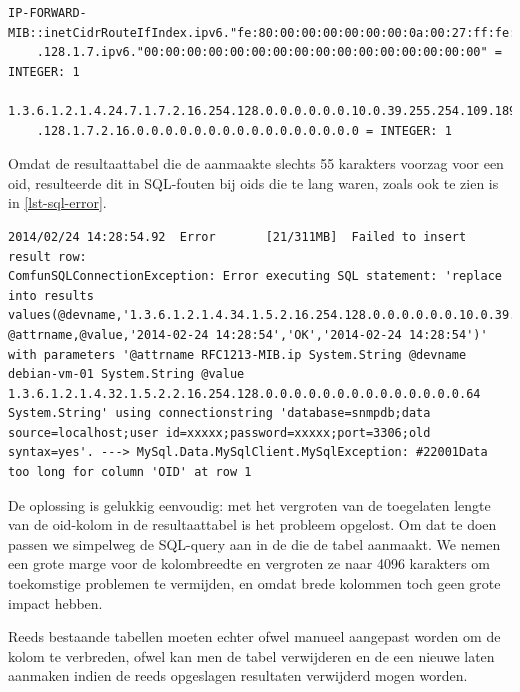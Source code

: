\begin{lstlisting}[float=h, caption={[Tekstuele en numerieke notatie van een OID uit inetCidrRouteTable]Tekstuele en numerieke notatie van een \gls{oid} uit inetCidrRouteTable}, label=lst-lange-oids]
IP-FORWARD-MIB::inetCidrRouteIfIndex.ipv6."fe:80:00:00:00:00:00:00:0a:00:27:ff:fe:6d:bd:c5"
	.128.1.7.ipv6."00:00:00:00:00:00:00:00:00:00:00:00:00:00:00:00" = INTEGER: 1

1.3.6.1.2.1.4.24.7.1.7.2.16.254.128.0.0.0.0.0.0.10.0.39.255.254.109.189.197
	.128.1.7.2.16.0.0.0.0.0.0.0.0.0.0.0.0.0.0.0.0 = INTEGER: 1
\end{lstlisting}

Omdat de resultaattabel die de \nwmretriever{} aanmaakte slechts 55 karakters voorzag voor een \gls{oid}, resulteerde dit
in SQL-fouten bij \glspl{oid} die te lang waren, zoals ook te zien is in \cref{lst-sql-error}.


\begin{lstlisting}[float=h, caption={[SQL-fout bij te lange OID]SQL-fout bij te lange \glspl{oid}}, label=lst-sql-error]
2014/02/24 14:28:54.92	Error		[21/311MB]	Failed to insert result row: 
ComfunSQLConnectionException: Error executing SQL statement: 'replace into results values(@devname,'1.3.6.1.2.1.4.34.1.5.2.16.254.128.0.0.0.0.0.0.10.0.39.255.254.109.189.197', @attrname,@value,'2014-02-24 14:28:54','OK','2014-02-24 14:28:54')' with parameters '@attrname RFC1213-MIB.ip System.String @devname debian-vm-01 System.String @value 1.3.6.1.2.1.4.32.1.5.2.2.16.254.128.0.0.0.0.0.0.0.0.0.0.0.0.0.0.64 System.String' using connectionstring 'database=snmpdb;data source=localhost;user id=xxxxx;password=xxxxx;port=3306;old syntax=yes'. ---> MySql.Data.MySqlClient.MySqlException: #22001Data too long for column 'OID' at row 1
\end{lstlisting}

De oplossing is gelukkig eenvoudig: met het vergroten van de toegelaten lengte van de \gls{oid}-kolom in de resultaattabel is het probleem opgelost.
Om dat te doen passen we simpelweg de SQL-query aan in de \nwmretriever{} die de tabel aanmaakt.
We nemen een grote marge voor de kolombreedte en vergroten ze naar 4096 karakters om toekomstige problemen te vermijden,
en omdat brede kolommen toch geen grote impact hebben.

Reeds bestaande tabellen moeten echter ofwel manueel aangepast worden om de kolom te verbreden,
ofwel kan men de tabel verwijderen en de \nwmretriever{} een nieuwe laten aanmaken indien de reeds opgeslagen resultaten verwijderd mogen worden.


